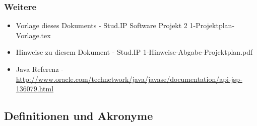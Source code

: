 \documentclass[fontsize=12pt,paper=a4,twoside]{scrartcl}
\begin{document}
\subsubsection{Weitere}
\begin{itemize}
\item{Vorlage dieses Dokuments - Stud.IP Software Projekt 2 1-Projektplan-Vorlage.tex}
\item{Hinweise zu diesem Dokument - Stud.IP 1-Hinweise-Abgabe-Projektplan.pdf}
\item{Java Referenz - \url{http://www.oracle.com/technetwork/java/javase/documentation/api-jsp-136079.html}}
\end{itemize}

%
%
%
%

{\renewcommand\section[2]{}

}

\newpage

\subsection{Definitionen und Akronyme\\}
\end{document}
